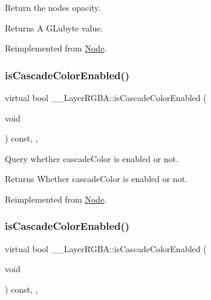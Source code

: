 Return the node\textquotesingle{}s opacity. \begin{DoxyReturn}{Returns}
A G\+Lubyte value. 
\end{DoxyReturn}


Reimplemented from \hyperlink{classNode_ab999cce3763ea09e74014245c770ea97}{Node}.

\mbox{\label{class____LayerRGBA_abc02efad9eb89df47e6a0365dc9c784e}} 
\subsubsection{\texorpdfstring{is\+Cascade\+Color\+Enabled()}{isCascadeColorEnabled()}\hspace{0.1cm}{\footnotesize\ttfamily [1/2]}}
{\footnotesize\ttfamily virtual bool \+\_\+\+\_\+\+Layer\+R\+G\+B\+A\+::is\+Cascade\+Color\+Enabled (\begin{DoxyParamCaption}\item[{void}]{ }\end{DoxyParamCaption}) const\hspace{0.3cm}{\ttfamily [inline]}, {\ttfamily [override]}, {\ttfamily [virtual]}}

Query whether cascade\+Color is enabled or not. \begin{DoxyReturn}{Returns}
Whether cascade\+Color is enabled or not. 
\end{DoxyReturn}


Reimplemented from \hyperlink{classNode_abf874f1b388e773ca80732b1134508be}{Node}.

\mbox{\label{class____LayerRGBA_abc02efad9eb89df47e6a0365dc9c784e}} 
\subsubsection{\texorpdfstring{is\+Cascade\+Color\+Enabled()}{isCascadeColorEnabled()}\hspace{0.1cm}{\footnotesize\ttfamily [2/2]}}
{\footnotesize\ttfamily virtual bool \+\_\+\+\_\+\+Layer\+R\+G\+B\+A\+::is\+Cascade\+Color\+Enabled (\begin{DoxyParamCaption}\item[{void}]{ }\end{DoxyParamCaption}) const\hspace{0.3cm}{\ttfamily [inline]}, {\ttfamily [override]}, {\ttfamily [virtual]}}

